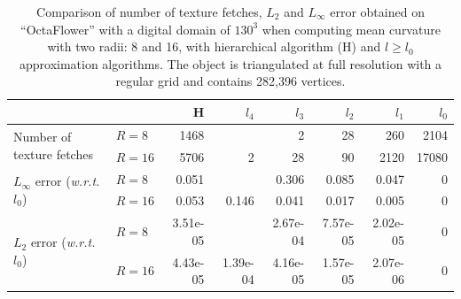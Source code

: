 \documentclass{llncs}
\newcommand{\wrt}{\emph{w.r.t.} }
\begin{document}
\begin{table}
  \begin{center}
  \setlength{\tabcolsep}{0.15cm}
	\begin{tabular}{@{}llrrrrrr@{}}
      \toprule
        & & H & $l_4$ & $l_3$ & $l_2$ & $l_1$ & $l_0$\\
      \midrule
      \multirow{2}{2.2cm}{Number of texture fetches} & $R=8$ & 1468 & & 2 & 28 & 260 & 2104 \\
                                & $R=16$ & 5706 & 2 & 28 & 90 & 2120 & 17080\\\midrule

      \multirow{2}{2.2cm}{$L_\infty$ error (\wrt $l_0$)} & $R=8$ & 0.051 & & 0.306 & 0.085 & 0.047 & 0\\
                                    & $R=16$ & 0.053 & 0.146 & 0.041 & 0.017 & 0.005 & 0\\\midrule

      \multirow{2}{2.1cm}{$L_2$ error (\wrt $l_0$)} & $R=8$ & 3.51e-05 & & 2.67e-04 & 7.57e-05 & 2.02e-05 & 0\\
                               & $R=16$ & 4.43e-05 & 1.39e-04 & 4.16e-05 & 1.57e-05 & 2.07e-06 & 0\\
      \bottomrule
    \end{tabular}
  \end{center}
  \caption{Comparison of number of texture fetches, $L_2$ and $L_\infty$ error
  obtained on ``OctaFlower'' with a digital domain of $130^3$ when computing mean
  curvature with two radii: 8 and 16, with hierarchical algorithm (H) and $l \ge
  l_0$ approximation algorithms. The object is triangulated at full resolution
  with a regular grid and contains 282,396 vertices.
  \label{tab:full-res-stat}}
\end{table}
\end{document}
